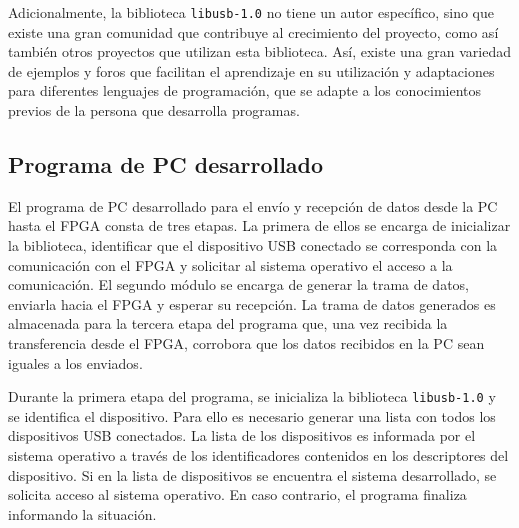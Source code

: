 	Adicionalmente, la biblioteca \verb|libusb-1.0| no tiene un autor específico, sino que existe una gran comunidad que contribuye al crecimiento del proyecto, como así también otros proyectos que utilizan esta biblioteca. Así, existe una gran variedad de ejemplos y foros que facilitan el aprendizaje en su utilización y adaptaciones para diferentes lenguajes de programación, que se adapte a los conocimientos previos de la persona que desarrolla programas.

\subsection{Programa de PC desarrollado}
	El programa de PC desarrollado para el envío y recepción de datos desde la PC hasta el FPGA consta de tres etapas. La primera de ellos se encarga de inicializar la biblioteca, identificar que el dispositivo USB conectado se corresponda con la comunicación con el FPGA y solicitar al sistema operativo el acceso a la comunicación.
	El segundo módulo se encarga de generar la trama de datos, enviarla hacia el FPGA y esperar su recepción. La trama de datos generados es almacenada para la tercera etapa del programa que, una vez recibida la transferencia desde el FPGA, corrobora que los datos recibidos en la PC sean iguales a los enviados.
	
	Durante la primera etapa del programa, se inicializa la biblioteca \verb|libusb-1.0| y se identifica el dispositivo. Para ello es necesario generar una lista con todos los dispositivos USB conectados.
	La lista de los dispositivos es informada por el sistema operativo a través de los identificadores contenidos en los descriptores del dispositivo. Si en la lista de dispositivos se encuentra el sistema desarrollado, se solicita acceso al sistema operativo. En caso contrario, el programa finaliza informando la situación.
	
